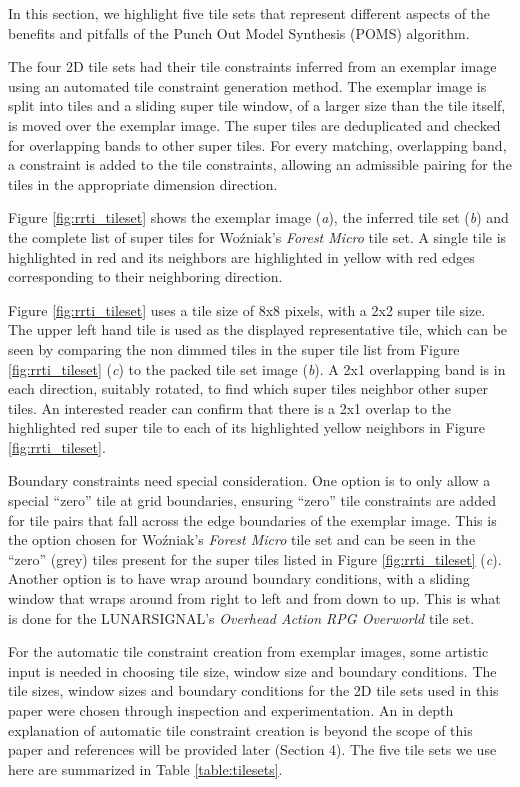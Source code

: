 In this section, we highlight five tile sets that represent different aspects of the
benefits and pitfalls of the Punch Out Model Synthesis (POMS) algorithm.

The four 2D tile sets had their tile constraints inferred from an exemplar image using
an automated tile constraint generation method.
The exemplar image is split into tiles and a sliding super tile window, of a larger size than the tile itself, is moved over the exemplar image.
The super tiles are deduplicated and checked for overlapping bands to other super tiles.
For every matching, overlapping band, a constraint is added to the tile constraints, allowing an admissible pairing for the tiles in the
appropriate dimension direction.

Figure \ref{fig:rrti_tileset} shows the exemplar image (\textit{a}), the inferred tile set (\textit{b}) and the complete list of super tiles
for Wo\'zniak's \textit{Forest Micro} tile set.
A single tile is highlighted in red and its neighbors are highlighted in yellow with red edges corresponding to their neighboring direction.

Figure \ref{fig:rrti_tileset} uses a tile size of 8x8 pixels, with a 2x2 super tile size.
The upper left hand tile is used as the displayed representative tile, which can be seen by comparing the non dimmed tiles in the
super tile list from Figure \ref{fig:rrti_tileset} (\textit{c}) to the packed tile set image (\textit{b}).
A 2x1 overlapping band is in each direction, suitably rotated, to find which super tiles neighbor other super tiles.
An interested reader can confirm that there is a 2x1 overlap to the highlighted red super tile to each of its highlighted yellow neighbors
in Figure \ref{fig:rrti_tileset}.

Boundary constraints need special consideration.
One option is to only allow a special ``zero'' tile at grid boundaries, ensuring ``zero'' tile constraints are added
for tile pairs that fall across the edge boundaries of the exemplar image.
This is the option chosen for Wo\'zniak's \textit{Forest Micro} tile set and can be seen in the ``zero'' (grey) tiles present for
the super tiles listed in Figure \ref{fig:rrti_tileset} (\textit{c}).
Another option is to have wrap around boundary conditions, with a sliding window that wraps around from right to left and from down to up.
This is what is done for the LUNARSIGNAL's \textit{Overhead Action RPG Overworld} tile set.

For the automatic tile constraint creation from exemplar images, some artistic input is needed in choosing tile size, window size and boundary conditions.
The tile sizes, window sizes and boundary conditions for the 2D tile sets used in this paper were chosen through inspection and experimentation.
An in depth explanation of automatic tile constraint creation is beyond the scope of this paper and references will be provided later (Section 4).
The five tile sets we use here are summarized in Table \ref{table:tilesets}.

